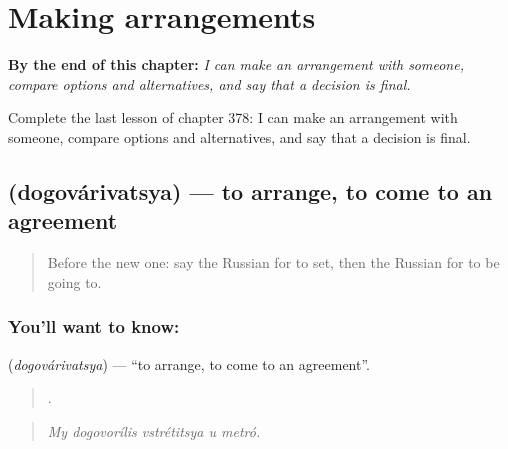 
\chapter{Making arrangements}
\label{ch:ru-making-arrangements}

\begin{chapteropening}
\textbf{By the end of this chapter:} \emph{I can make an arrangement with someone, compare options and alternatives, and say that a decision is final.}

Complete the last lesson of chapter 378: I can make an arrangement with someone, compare options and alternatives, and say that a decision is final.
\end{chapteropening}

\section[\texorpdfstring{\ru{договариваться} (dogovárivatsya)}{договариваться (dogovárivatsya)}]{ (dogovárivatsya) — to arrange, to come to an agreement}

\label{lesson:RU-C378-dogovarivatsya}



\begin{quote}
Before the new one: say the Russian for to set, then the Russian for to be going to.
\end{quote}

\subsection*{You'll want to know: }
\textbf{} (\emph{dogovárivatsya}) — \textquotedblleft{}to arrange, to come to an agreement\textquotedblright{}.

\begin{quote}
    .
\end{quote}

\begin{quote}
\emph{My dogovorílis vstrétitsya u metró.}
\end{quote}

